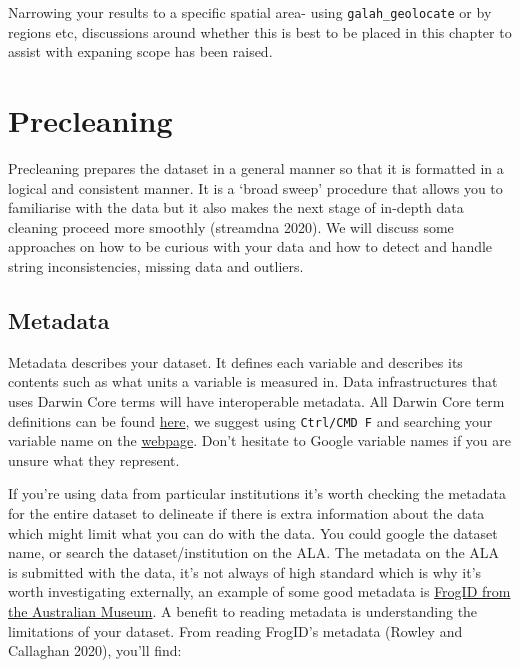 \documentclass[
  letterpaper,
  DIV=11,
  numbers=noendperiod,
  oneside]{scrreprt}
\begin{document}
Narrowing your results to a specific spatial area- using
\texttt{galah\_geolocate} or by regions etc, discussions around whether
this is best to be placed in this chapter to assist with expaning scope
has been raised.


\hypertarget{precleaning}{%
\chapter{Precleaning}\label{precleaning}}

Precleaning prepares the dataset in a general manner so that it is
formatted in a logical and consistent manner. It is a `broad sweep'
procedure that allows you to familiarise with the data but it also makes
the next stage of in-depth data cleaning proceed more smoothly
(streamdna 2020). We will discuss some approaches on how to be curious
with your data and how to detect and handle string inconsistencies,
missing data and outliers.

\hypertarget{metadata}{%
\section{Metadata}\label{metadata}}

Metadata describes your dataset. It defines each variable and describes
its contents such as what units a variable is measured in. Data
infrastructures that uses Darwin Core terms will have interoperable
metadata. All Darwin Core term definitions can be found
\href{https://dwc.tdwg.org/terms/}{here}, we suggest using
\texttt{Ctrl/CMD\ F} and searching your variable name on the
\href{https://dwc.tdwg.org/terms/}{webpage}. Don't hesitate to Google
variable names if you are unsure what they represent.

If you're using data from particular institutions it's worth checking
the metadata for the entire dataset to delineate if there is extra
information about the data which might limit what you can do with the
data. You could google the dataset name, or search the
dataset/institution on the ALA. The metadata on the ALA is submitted
with the data, it's not always of high standard which is why it's worth
investigating externally, an example of some good metadata is
\href{https://collections.ala.org.au/public/show/dr14760}{FrogID from
the Australian Museum}. A benefit to reading metadata is understanding
the limitations of your dataset. From reading FrogID's metadata (Rowley
and Callaghan 2020), you'll find:
\end{document}
